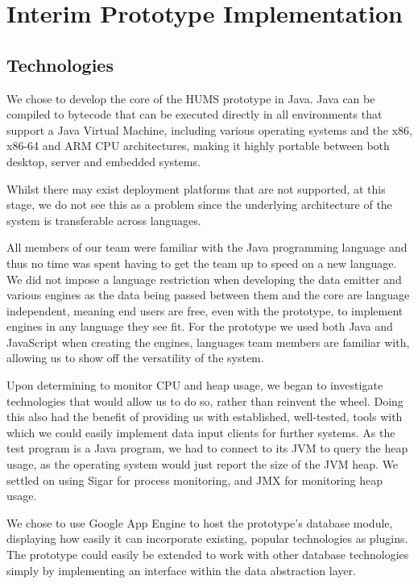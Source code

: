 \documentclass[10pt,a4paper]{article}
\begin{document}
\section{Interim Prototype Implementation}

\subsection{Technologies}

We chose to develop the core of the HUMS prototype in Java. Java can
be compiled to bytecode that can be executed directly in all
environments that support a Java Virtual Machine, including various
operating systems and the x86, x86-64 and ARM CPU architectures,
making it highly portable between both desktop, server and embedded
systems.


Whilst there may exist deployment platforms that are not supported, at
this stage, we do not see this as a problem since the underlying
architecture of the system is transferable across languages.

All members of our team were familiar with the Java programming
language and thus no time was spent having to get the team up to speed
on a new language. We did not impose a language restriction when
developing the data emitter and various engines as the data being
passed between them and the core are language independent, meaning 
end
users are free, even with the prototype, to implement engines in any
language they see fit. For the prototype we used both Java and
JavaScript when creating the engines, languages team members are
familiar with, allowing us to show off the versatility of the system.

Upon determining to monitor CPU and heap usage, we began to investigate
technologies that would allow us to do so, rather than reinvent the wheel.
Doing this also had the benefit of providing us with established, well-tested,
tools with which we could easily implement data input clients for further
systems. As the test program is a Java program, we had to connect to its JVM to
query the heap usage, as the operating system would just report the size of the
JVM heap. We settled on using Sigar for process monitoring, and JMX for
monitoring heap usage.

We chose to use Google App Engine to host the prototype's database
module, displaying how easily it can incorporate existing, popular
technologies as plugins. The prototype could easily be extended to
work with other database technologies simply by implementing an
interface within the data abstraction layer.
\end{document}
